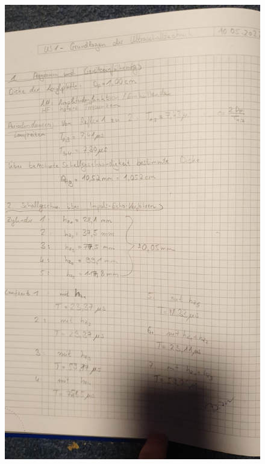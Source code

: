 \begin{figure}
    \centering
    \includegraphics[width=\textwidth]{data/Messdaten_1.jpeg}
\end{figure}

